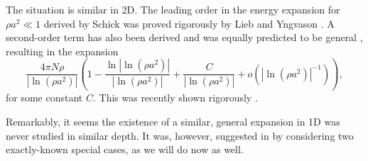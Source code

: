 \documentclass[a4paper,11pt]{article}
\newcommand{\abs}[1]{\left\lvert #1 \right\rvert}
\numberwithin{equation}{section}
\begin{document}
The situation is similar in 2D. The leading order in the energy expansion for $\rho a^2\ll1$ derived by Schick \cite{schick1971two} was proved rigorously by Lieb and Yngvason \cite{lieb2001ground}. A second-order term has also been derived and was equally predicted to be general \cite{andersen2002ground,mora2009ground,fournais2019ground}, resulting in the expansion
\begin{equation}
\label{result2D}
\frac{4\pi N\rho}{\abs{\ln(\rho a^2)}}\left(1-\frac{\ln{\abs{\ln(\rho a^2)}}}{\abs{\ln(\rho a^2)}}+\frac{C}{\abs{\ln(\rho a^2)}}+o\left(\abs{\ln(\rho a^2)}^{-1}\right)\right),
\end{equation}
for some constant $C$. This was recently shown rigorously \cite{fournais2022ground}. 

Remarkably, it seems the existence of a similar, general expansion in 1D was never studied in similar depth. It was, however, suggested in \cite{astrakharchik2010low} by considering two exactly-known special cases, as we will do now as well.
\end{document}
